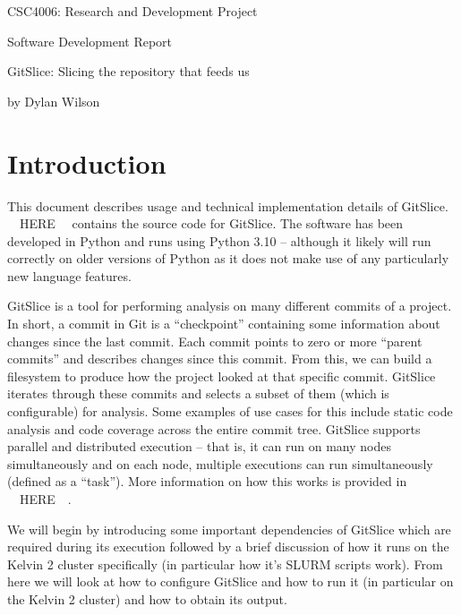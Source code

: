 \documentclass[11pt]{article}
\begin{document}
    \begin{titlepage}
        \begin{center}
            \Large
            CSC4006: Research and Development Project

            \vfill
            \Huge
            Software Development Report

            \medskip
            \Large
            GitSlice: Slicing the repository that feeds us

            \vfill
            \Large
            by Dylan Wilson
        \end{center}
    \end{titlepage}

    \tableofcontents

    \section{Introduction}\label{sec:introduction}

    This document describes usage and technical implementation details of GitSlice.   ~~HERE~~ contains the source code for GitSlice. The software has been developed in Python and runs using Python 3.10 – although it likely will run correctly on older versions of Python as it does not make use of any particularly new language features.

    GitSlice is a tool for performing analysis on many different commits of a project.  In short, a commit in Git is a ``checkpoint'' containing some information about changes since the last commit.  Each commit points to zero or more ``parent commits'' and describes changes since this commit.  From this, we can build a filesystem to produce how the project looked at that specific commit.  GitSlice iterates through these commits and selects a subset of them (which is configurable) for analysis.  Some examples of use cases for this include static code analysis and code coverage across the entire commit tree.  GitSlice supports parallel and distributed execution – that is, it can run on many nodes simultaneously and on each node, multiple executions can run simultaneously (defined as a ``task'').  More information on how this works is provided in ~~HERE~~.

    We will begin by introducing some important dependencies of GitSlice which are required during its execution followed by a brief discussion of how it runs on the Kelvin 2 cluster specifically (in particular how it’s SLURM scripts work).  From here we will look at how to configure GitSlice and how to run it (in particular on the Kelvin 2 cluster) and how to obtain its output.
\end{document}
